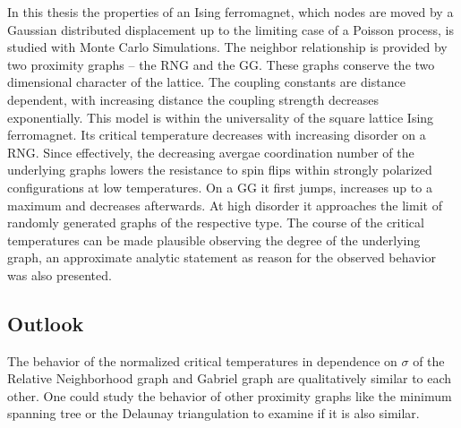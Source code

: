In this thesis the properties of an Ising ferromagnet, which nodes are
moved by a Gaussian distributed displacement up to the limiting case of
a Poisson process, is studied with Monte Carlo
Simulations. The neighbor relationship is provided by two proximity graphs
-- the RNG and the GG. These graphs conserve the two dimensional character
of the lattice. The coupling constants
are distance dependent, with increasing distance the coupling strength
decreases exponentially.
This model is within the universality of the square lattice Ising
ferromagnet. Its critical temperature decreases with increasing disorder
on a RNG. Since effectively, the decreasing avergae coordination number
of the underlying graphs lowers the resistance to spin flips within
strongly polarized configurations at low temperatures.
 On a GG it first jumps, increases up to a maximum and decreases
afterwards. At high disorder it approaches the limit of randomly generated
graphs of the respective type. The course of the critical temperatures
can be made plausible observing the degree of the underlying graph, an
approximate analytic statement as reason for the observed behavior was
also presented.

\subsection{Outlook}
    The behavior of the normalized critical temperatures in dependence
    on \(\sigma\) of the Relative Neighborhood graph and Gabriel graph
    are qualitatively similar to each other. One could study the behavior
    of other proximity graphs like the minimum spanning tree or the
    Delaunay triangulation to examine if it is also similar.\\
